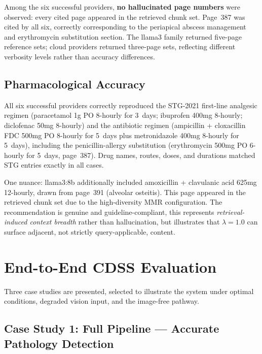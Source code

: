 \documentclass[12pt,a4paper]{report}
\begin{document}
Among the six successful providers, \textbf{no hallucinated page numbers}
were observed: every cited page appeared in the retrieved chunk set.
Page~387 was cited by all six, correctly corresponding to the periapical
abscess management and erythromycin substitution section. The llama3 family
returned five-page reference sets; cloud providers returned three-page sets,
reflecting different verbosity levels rather than accuracy differences.

\subsection{Pharmacological Accuracy}

All six successful providers correctly reproduced the STG-2021 first-line
analgesic regimen (paracetamol 1g PO 8-hourly for 3~days; ibuprofen 400mg
8-hourly; diclofenac 50mg 8-hourly) and the antibiotic regimen (ampicillin +
cloxacillin FDC 500mg PO 8-hourly for 5~days plus metronidazole 400mg 8-hourly
for 5~days), including the penicillin-allergy substitution (erythromycin 500mg
PO 6-hourly for 5~days, page~387). Drug names, routes, doses, and durations
matched STG entries exactly in all cases.

One nuance: llama3:8b additionally included amoxicillin + clavulanic acid 625mg
12-hourly, drawn from page~391 (alveolar osteitis). This page appeared in the
retrieved chunk set due to the high-diversity MMR configuration. The recommendation
is genuine and guideline-compliant, this represents \emph{retrieval-induced
context breadth} rather than hallucination, but illustrates that $\lambda{=}1.0$
can surface adjacent, not strictly query-applicable, content.

\section{End-to-End CDSS Evaluation}
\label{sec:results_cdss}

Three case studies are presented, selected to illustrate the system under
optimal conditions, degraded vision input, and the image-free pathway.

\subsection{Case Study 1: Full Pipeline --- Accurate Pathology Detection}
\label{subsec:case1}
\end{document}
